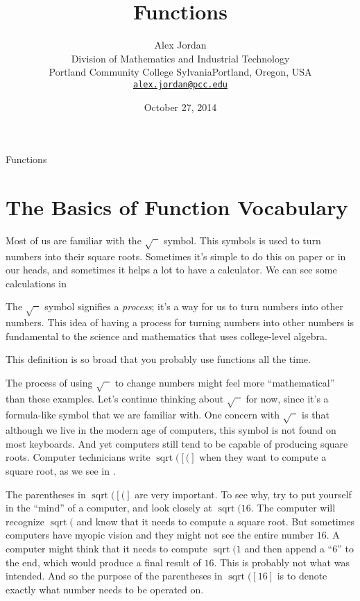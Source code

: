 \documentclass[10pt,]{article}
\title{Functions}
\author{Alex Jordan\\
Division of Mathematics and Industrial Technology\\
Portland Community College Sylvania\newline  Portland, Oregon, USA\\
\href{mailto:alex.jordan@pcc.edu}{\nolinkurl{alex.jordan@pcc.edu}}
}
\date{October 27, 2014}
\theoremstyle{plain}
\theoremstyle{definition}
\newcommand\num{}
\newcommand\sq{\operatorname{sqrt}(}
\begin{document}
%
\maketitle
%
\thispagestyle{empty}
%
Functions\typeout{************************************************}
\typeout{************************************************}
%
\section{The Basics of Function Vocabulary}\label{section-1}
%
Most of us are familiar with the $\sqrt{\phantom{x}}$ symbol.
		This symbols is used to turn numbers into their square roots. Sometimes it's
		simple to do this on paper or in our heads, and sometimes it helps a lot to
		have a calculator. We can see some calculations in 
%
\par The $\sqrt{\phantom{x}}$ symbol signifies a \emph{process}; it's a way for us to
		turn numbers into other numbers. This idea of having a process for turning numbers into other
		numbers is fundamental to the science and mathematics that uses college-level algebra.
%
\par This definition is so broad that you probably use functions all the time.
%
\par The process of using $\sqrt{\phantom{x}}$ to change numbers might feel more ``mathematical''
		than these examples. Let's continue thinking about $\sqrt{\phantom{x}}$ for now, since
		it's a formula-like symbol that we are familiar with. One concern with  $\sqrt{\phantom{x}}$
		is that although we live in the modern age of computers, this symbol is not found on most
		keyboards. And yet computers still tend to be capable of producing square roots. Computer
		technicians write $\sq[(]$ when they want to compute a square root, as we see in .
%
\par  The parentheses in $\sq[(]$ are very important. To see why, try to put yourself in the
		``mind'' of a computer, and look closely at $\sq\num{16}$. The computer will recognize $\sq$
		and know that it needs to compute a square root. But sometimes computers have myopic vision and 
		they might not see the entire number $\num{16}$. A computer might think that it needs to compute 
		$\sq\num{1}$ and then append a ``6'' to the end, which would produce a final result of $\num{16}$. 
		This is probably not what was intended. And so the purpose of the parentheses in $\sq[\num{16}]$ is 
		to denote exactly what number needs to be operated on.
%
\end{document}
